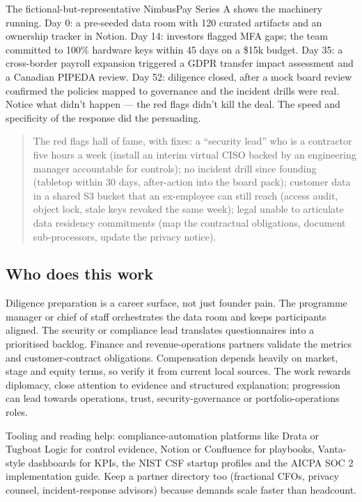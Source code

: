 The fictional-but-representative NimbusPay Series A shows the machinery running. Day 0: a pre-seeded data room with 120 curated artifacts and an ownership tracker in Notion. Day 14: investors flagged MFA gaps; the team committed to 100\% hardware keys within 45 days on a \$15k budget. Day 35: a cross-border payroll expansion triggered a GDPR transfer impact assessment and a Canadian PIPEDA review. Day 52: diligence closed, after a mock board review confirmed the policies mapped to governance and the incident drills were real. Notice what didn't happen — the red flags didn't kill the deal. The speed and specificity of the response did the persuading.



\begin{quote}\small
The red flags hall of fame, with fixes: a ``security lead'' who is a contractor five hours a week (install an interim virtual CISO backed by an engineering manager accountable for controls); no incident drill since founding (tabletop within 30 days, after-action into the board pack); customer data in a shared S3 bucket that an ex-employee can still reach (access audit, object lock, stale keys revoked the same week); legal unable to articulate data residency commitments (map the contractual obligations, document sub-processors, update the privacy notice).
\end{quote}



\subsection{Who does this work}


Diligence preparation is a career surface, not just founder pain. The programme manager or chief of staff orchestrates the data room and keeps participants aligned. The security or compliance lead translates questionnaires into a prioritised backlog. Finance and revenue-operations partners validate the metrics and customer-contract obligations. Compensation depends heavily on market, stage and equity terms, so verify it from current local sources. The work rewards diplomacy, close attention to evidence and structured explanation; progression can lead towards operations, trust, security-governance or portfolio-operations roles.


Tooling and reading help: compliance-automation platforms like Drata or Tugboat Logic for control evidence, Notion or Confluence for playbooks, Vanta-style dashboards for KPIs, the NIST CSF startup profiles and the AICPA SOC 2 implementation guide. Keep a partner directory too (fractional CFOs, privacy counsel, incident-response advisors) because demands scale faster than headcount.


